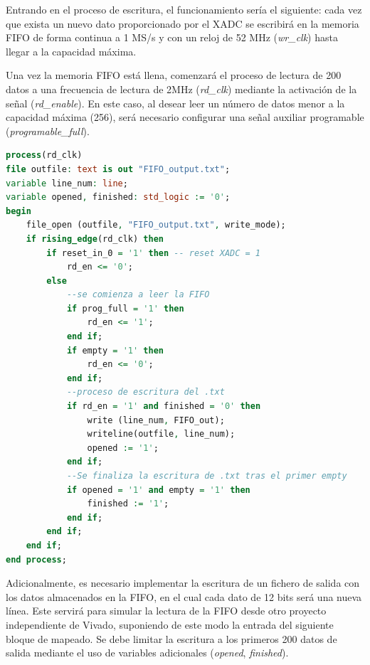 \vspace{3mm}

\pagebreak

Entrando en el proceso de escritura, el funcionamiento sería el siguiente: cada vez que exista un nuevo dato proporcionado por el XADC se escribirá en la memoria FIFO de forma continua a 1 MS/s y con un reloj de 52 MHz (\textit{wr\_clk}) hasta llegar a la capacidad máxima.

Una vez la memoria FIFO está llena, comenzará el proceso de lectura de 200 datos a una frecuencia de lectura de 2MHz (\textit{rd\_clk}) mediante la activación de la señal (\textit{rd\_enable}). En este caso, al desear leer un número de datos menor a la capacidad máxima (256), será necesario configurar una señal auxiliar programable (\textit{programable\_full}).

\vspace{5mm}

\begin{lstlisting}[language=VHDL, style=mystyle, caption={Proceso de lectura}]
process(rd_clk) 
file outfile: text is out "FIFO_output.txt"; 
variable line_num: line;
variable opened, finished: std_logic := '0'; 
begin
    file_open (outfile, "FIFO_output.txt", write_mode); 
    if rising_edge(rd_clk) then
        if reset_in_0 = '1' then -- reset XADC = 1
            rd_en <= '0';
        else
            --se comienza a leer la FIFO 
            if prog_full = '1' then 
                rd_en <= '1';
            end if; 
            if empty = '1' then  
                rd_en <= '0';
            end if;
            --proceso de escritura del .txt
            if rd_en = '1' and finished = '0' then 
                write (line_num, FIFO_out);
                writeline(outfile, line_num);
                opened := '1';
            end if;
            --Se finaliza la escritura de .txt tras el primer empty
            if opened = '1' and empty = '1' then 
                finished := '1';
            end if;
        end if;
    end if;
end process;   
\end{lstlisting}

\vspace{3mm}

Adicionalmente, es necesario implementar la escritura de un fichero de salida con los datos almacenados en la FIFO, en el cual cada dato de 12 bits será una nueva línea. Este servirá para simular la lectura de la FIFO desde otro proyecto independiente de Vivado, suponiendo de este modo la entrada del siguiente bloque de mapeado. Se debe limitar la escritura a los primeros 200 datos de salida mediante el uso de variables adicionales (\textit{opened}, \textit{finished}).


